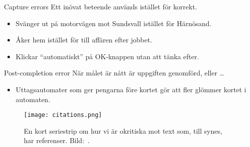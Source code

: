 \documentclass{beamer}
\begin{document}
\begin{frame}
  \begin{block}{Capture errors}
    Ett inövat beteende används istället för korrekt.
  \end{block}

  \pause{}

  \begin{example}
    \begin{itemize}
      \item Svänger ut på motorvägen mot Sundsvall istället för Härnösand.
      \item Åker hem istället för till affären efter jobbet.
      \item Klickar \enquote{automatiskt} på OK-knappen utan att tänka efter.
    \end{itemize}
  \end{example}
\end{frame}

\begin{frame}
  \begin{block}{Post-completion error}
    När målet är nått är uppgiften genomförd, eller \dots
  \end{block}

  \pause{}

  \begin{example}
    \begin{itemize}
      \item Uttagsautomater som ger pengarna före kortet gör att fler glömmer 
        kortet i automaten.
    \end{itemize}
  \end{example}
\end{frame}

\begin{frame}
  \begin{figure}
    \texttt{[image: citations.png]}
    \caption{En kort seriestrip om hur vi är okritiska mot text som, till 
    synes, har referenser.
    Bild:~\cite{xkcd906}.}
  \end{figure}
\end{frame}
\end{document}
